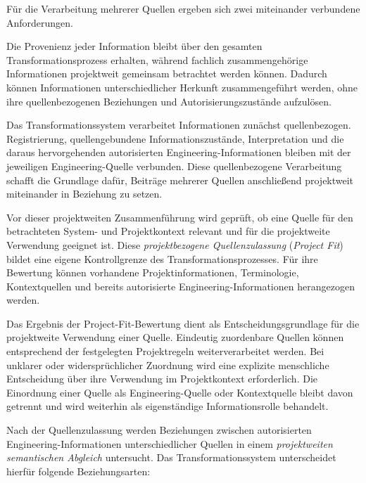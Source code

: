 Für die Verarbeitung mehrerer Quellen ergeben sich zwei miteinander
verbundene Anforderungen. 

\noindent Die Provenienz jeder Information bleibt über den
gesamten Transformationsprozess erhalten, während fachlich zusammengehörige
Informationen projektweit gemeinsam betrachtet werden können. Dadurch können
Informationen unterschiedlicher Herkunft zusammengeführt werden, ohne ihre
quellenbezogenen Beziehungen und Autorisierungszustände aufzulösen.

Das Transformationssystem verarbeitet Informationen zunächst
quellenbezogen. Registrierung, quellengebundene Informationszustände,
Interpretation und die daraus hervorgehenden autorisierten
Engineering-Informationen bleiben mit der jeweiligen Engineering-Quelle
verbunden. Diese quellenbezogene Verarbeitung schafft die Grundlage dafür,
Beiträge mehrerer Quellen anschließend projektweit miteinander in Beziehung
zu setzen.

Vor dieser projektweiten Zusammenführung wird geprüft, ob eine Quelle für
den betrachteten System- und Projektkontext relevant und für die
projektweite Verwendung geeignet ist. Diese
\emph{projektbezogene Quellenzulassung} (\emph{Project Fit}) bildet eine
eigene Kontrollgrenze des Transformationsprozesses. Für ihre Bewertung
können vorhandene Projektinformationen, Terminologie, Kontextquellen und
bereits autorisierte Engineering-Informationen herangezogen werden.

Das Ergebnis der Project-Fit-Bewertung dient als Entscheidungsgrundlage für
die projektweite Verwendung einer Quelle. Eindeutig zuordenbare Quellen
können entsprechend der festgelegten Projektregeln weiterverarbeitet werden.
Bei unklarer oder widersprüchlicher Zuordnung wird eine explizite
menschliche Entscheidung über ihre Verwendung im Projektkontext
erforderlich. Die Einordnung einer Quelle als Engineering-Quelle oder
Kontextquelle bleibt davon getrennt und wird weiterhin als eigenständige
Informationsrolle behandelt.

Nach der Quellenzulassung werden Beziehungen zwischen autorisierten
Engineering-Informationen unterschiedlicher Quellen in einem
\emph{projektweiten semantischen Abgleich} untersucht. Das
Transformationssystem unterscheidet hierfür folgende Beziehungsarten:

